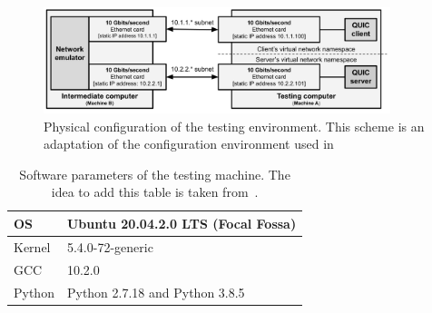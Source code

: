 \documentclass[12pt,a4paper]{report}
\begin{document}
    \begin{figure}[ht]
    \centering
    \includegraphics[width=0.9\textwidth]{figs/Physical_testing_environment.png}
    \caption[Physical configuration of the testing environment]{Physical configuration of the testing environment. This scheme is an adaptation of the configuration environment used in ~\cite{Making_QUIC_Quicker}}
    \label{fig:Physical_testing_environment}
    \end{figure}
    
    \begin{table}[ht]
        \centering
        \begin{tabular}{|l|l|}
        \hline
        OS     & Ubuntu 20.04.2.0 LTS (Focal Fossa) \\ \hline
        Kernel & 5.4.0-72-generic                   \\ \hline
        GCC    & 10.2.0                             \\ \hline
        Python & Python 2.7.18 and Python 3.8.5     \\ \hline
        \end{tabular}
        
        \caption[Software parameters of the testing machine]{Software parameters of the testing machine. The idea to add this table is taken from~\cite{quic_vs_tcp}.}
        \label{software_parameters_of_testing_machine}
    \end{table}
    
\end{document}
